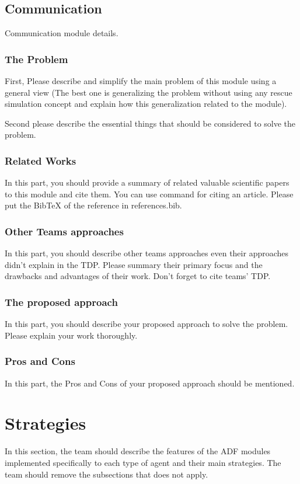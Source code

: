 \documentclass[runningheads,a4paper]{llncs}
\begin{document}
\subsection{Communication}
Communication module details.
\subsubsection{The Problem}
First, Please describe and simplify the main problem of this module using a general view (The best one is generalizing the problem without using any rescue simulation concept and explain how this generalization related to the module).

Second please describe the essential things that should be considered to solve the problem.
\subsubsection{Related Works}
In this part, you should provide a summary of related valuable scientific papers to this module and cite them. You can use command \cite{ref1} for citing an article. Please put the BibTeX of the reference in references.bib.
\subsubsection{Other Teams approaches}
In this part, you should describe other teams approaches even their approaches didn't explain in the TDP. Please summary their primary focus and the drawbacks and advantages of their work. Don't forget to cite teams' TDP.
\subsubsection{The proposed approach}
In this part, you should describe your proposed approach to solve the problem. Please explain your work thoroughly.
\subsubsection{Pros and Cons}
In this part, the Pros and Cons of your proposed approach should be mentioned.


\section{Strategies}
In this section, the team should describe the features of the ADF modules
implemented specifically to each type of agent and their main strategies. The
team should remove the subsections that does not apply.
\end{document}
